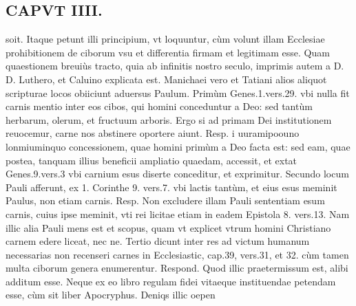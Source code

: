 \documentclass{article}
\begin{document}
\begin{pages}
\section*{CAPVT  IIII. }\pstart soit. Itaque petunt illi principium, vt loquuntur, cùm volunt illam Ecclesiae prohibitionem de ciborum vsu et differentia firmam et legitimam esse. Quam quaestionem breuiùs tracto, quia ab infinitis nostro seculo, imprimis autem a D. D. Luthero, et Caluino explicata est.  \pend\pstart Manichaei vero et Tatiani alios aliquot scripturae locos obiiciunt aduersus Paulum. Primùm Genes.1.vers.29. vbi nulla fit carnis mentio inter eos cibos, qui homini conceduntur a Deo: sed tantùm herbarum, olerum, et fructuum arboris. Ergo si ad primam Dei institutionem reuocemur, carne nos abstinere oportere aiunt. Resp. i uuramipoouno lonmiuminquo concessionem, quae homini primùm a Deo facta est: sed eam, quae postea, tanquam illius beneficii ampliatio quaedam, accessit, et extat Genes.9.vers.3 vbi carnium esus diserte conceditur, et exprimitur.  \pend\pstart Secundo locum Pauli afferunt, ex 1. Corinthe 9. vers.7. vbi lactis tantùm, et eius esus meminit Paulus, non etiam carnis. Resp. Non excludere illam Pauli sententiam esum carnis, cuius ipse meminit, vti rei licitae etiam in eadem Epistola 8. vers.13. Nam illic alia Pauli mens est et scopus, quam vt explicet vtrum homini Christiano carnem edere liceat, nec ne.  \pend\pstart Tertio dicunt inter res ad victum humanum necessarias non recenseri carnes in Ecclesiastic, cap.39, vers.31, et 32. cùm tamen multa ciborum genera enumerentur. Respond. Quod illic praetermissum est, alibi additum esse. Neque ex eo libro regulam fidei vitaeque instituendae petendam esse, cùm sit liber Apocryphus. Deniqs illic oepen\pend

\end{pages}
\end{document}
